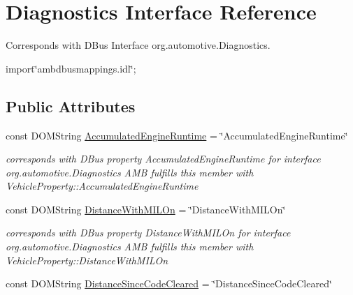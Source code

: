 \hypertarget{interfaceDiagnostics}{\section{Diagnostics Interface Reference}
\label{interfaceDiagnostics}
}


Corresponds with D\+Bus Interface org.\+automotive.\+Diagnostics.  




{\ttfamily import\char`\"{}ambdbusmappings.\+idl\char`\"{};}

\subsection*{Public Attributes}
\begin{DoxyCompactItemize}
\item 
\hypertarget{interfaceDiagnostics_af8f65ae2123f41c68215a89acba50c9b}{const D\+O\+M\+String \hyperlink{interfaceDiagnostics_af8f65ae2123f41c68215a89acba50c9b}{Accumulated\+Engine\+Runtime} = \char`\"{}Accumulated\+Engine\+Runtime\char`\"{}}\label{interfaceDiagnostics_af8f65ae2123f41c68215a89acba50c9b}

\begin{DoxyCompactList}\small\item\em corresponds with D\+Bus property Accumulated\+Engine\+Runtime for interface org.\+automotive.\+Diagnostics A\+M\+B fulfills this member with Vehicle\+Property\+::\+Accumulated\+Engine\+Runtime \end{DoxyCompactList}\item 
\hypertarget{interfaceDiagnostics_a79fff4ae27dd4008648fcf6578d7042f}{const D\+O\+M\+String \hyperlink{interfaceDiagnostics_a79fff4ae27dd4008648fcf6578d7042f}{Distance\+With\+M\+I\+L\+On} = \char`\"{}Distance\+With\+M\+I\+L\+On\char`\"{}}\label{interfaceDiagnostics_a79fff4ae27dd4008648fcf6578d7042f}

\begin{DoxyCompactList}\small\item\em corresponds with D\+Bus property Distance\+With\+M\+I\+L\+On for interface org.\+automotive.\+Diagnostics A\+M\+B fulfills this member with Vehicle\+Property\+::\+Distance\+With\+M\+I\+L\+On \end{DoxyCompactList}\item 
\hypertarget{interfaceDiagnostics_a11cd4c9caad67a28833b49c36f465af7}{const D\+O\+M\+String \hyperlink{interfaceDiagnostics_a11cd4c9caad67a28833b49c36f465af7}{Distance\+Since\+Code\+Cleared} = \char`\"{}Distance\+Since\+Code\+Cleared\char`\"{}}\label{interfaceDiagnostics_a11cd4c9caad67a28833b49c36f465af7}


\end{DoxyCompactItemize}
